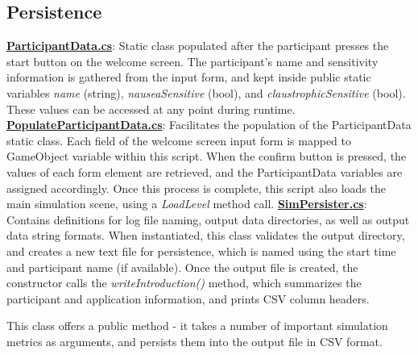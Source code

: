 \documentclass{article}
\begin{document}
\subsection*{Persistence} %
\href{https://bit.ly/2Fhq8B2}{\textbf{ParticipantData.cs}}: Static class populated after the participant presses the start button on the welcome screen. The participant's name and sensitivity information is gathered from the input form, and kept inside public static variables \textit{name} (string), \textit{nauseaSensitive} (bool), and \textit{claustrophicSensitive} (bool). These values can be accessed at any point during runtime. \newline \newline
\href{https://bit.ly/2WgL6qR}{\textbf{PopulateParticipantData.cs}}: Facilitates the population of the ParticipantData static class. Each field of the welcome screen input form is mapped to GameObject variable within this script. When the confirm button is pressed, the values of each form element are retrieved, and the ParticipantData variables are assigned accordingly. Once this process is complete, this script also loads the main simulation scene, using a \textit{LoadLevel} method call. \newline \newline
\href{https://bit.ly/2OdbwH6}{\textbf{SimPersister.cs}}: Contains definitions for log file naming, output data directories, as well as output data string formats. When instantiated, this class validates the output directory, and creates a new text file for persistence, which is named using the start time and participant name (if available). Once the output file is created, the constructor calls the \textit{writeIntroduction()} method, which summarizes the participant and application information, and prints CSV column headers.

This class offers a public method  - it takes a number of important simulation metrics as arguments, and persists them into the output file in CSV format.
\end{document}
